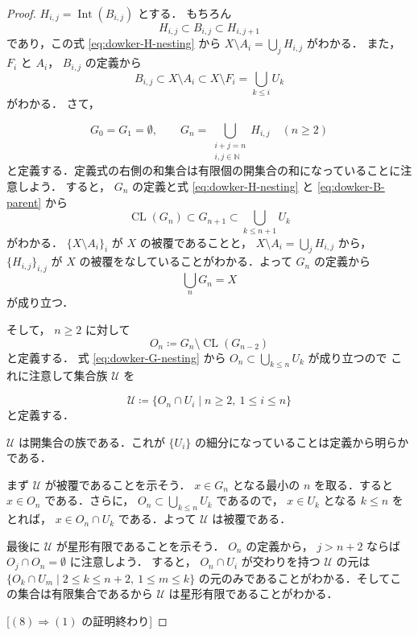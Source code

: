 \documentclass[leqno, 12pt]{ltjsarticle}
\newcommand{\To}{\Longrightarrow}
\newcommand{\nn}{\mathbb{N}}
\DeclareMathOperator{\cl}{CL}
\DeclareMathOperator{\nai}{Int}
\begin{document}
\begin{proof}
$H_{i,j}=\nai(B_{i,j})$
とする．
もちろん
\begin{equation*}
H_{i, j}\subset B_{i, j}\subset H_{i,j+1}
\tag{a}\label{eq:dowker-H-nesting}
\end{equation*}
であり，この式
\eqref{eq:dowker-H-nesting}
から
$X\setminus A_{i}=\bigcup_{j}H_{i, j}$
がわかる．
また，
$F_{i}$
と
$A_{i}$，
$B_{i,j}$
の定義から
\begin{equation*}
B_{i,j}\subset X\setminus A_{i}\subset X\setminus F_{i}=\bigcup_{k\le i}U_{k}
\tag{b}\label{eq:dowker-B-parent}
\end{equation*}
がわかる．
さて，

\[
G_{0}=G_{1}=\emptyset,\qquad
G_{n}=\bigcup_{\substack{i+j=n\\i,j\in\nn}}H_{i,j}\quad(n\ge 2)
\]
と定義する．定義式の右側の和集合は有限個の開集合の和になっていることに注意しよう．
すると，
$G_{n}$
の定義と式
\eqref{eq:dowker-H-nesting}
と
\eqref{eq:dowker-B-parent}
から
\begin{equation*}
\cl(G_{n})\subset G_{n+1}\subset \bigcup_{k\le n+1}U_{k}
\tag{c}\label{eq:dowker-G-nesting}
\end{equation*}
がわかる．
$\{X\setminus A_{i}\}_{i}$
が
$X$
の被覆であることと，
$X\setminus A_{i}=\bigcup_{j}H_{i,j}$
から，
$\{H_{i,j}\}_{i,j}$
が
$X$
の被覆をなしていることがわかる．よって
$G_{n}$
の定義から
\[
\bigcup_{n}G_{n}=X
\]
が成り立つ．

そして，
$n\ge 2$
に対して
\[
O_{n}\coloneqq G_{n}\setminus \cl(G_{n-2})
\]
と定義する．
式
\eqref{eq:dowker-G-nesting}
から
$O_{n}\subset \bigcup_{k\le n}U_{k}$
が成り立つので
これに注意して集合族
$\mathcal{U}$
を

\[
\mathcal{U}\coloneqq\{O_{n}\cap U_{i} \mid n\ge 2,\ 1\le i\le n\}
\]
と定義する．

$\mathcal{U}$
は開集合の族である．これが
$\{U_{i}\}$
の細分になっていることは定義から明らかである．


まず
$\mathcal{U}$
が被覆であることを示そう．
$x\in G_{n}$
となる最小の
$n$
を取る．すると
$x\in O_{n}$
である．さらに，
$O_{n}\subset \bigcup_{k\le n}U_{k}$
であるので，
$x\in U_{k}$
となる
$k\le n$
をとれば，
$x\in O_{n}\cap U_{k}$
である．よって
$\mathcal{U}$
は被覆である．

最後に
$\mathcal{U}$
が星形有限であることを示そう．
$O_{n}$
の定義から，
$j>n+2$
ならば
$O_{j}\cap O_{n}=\emptyset$
に注意しよう．
すると，
$O_{n}\cap U_{i}$
が交わりを持つ
$\mathcal{U}$
の元は
$\{O_{k}\cap U_{m} \mid 2\le k\le n+2,\ 1\le m\le k\}$
の元のみであることがわかる．そしてこの集合は有限集合であるから
$\mathcal{U}$
は星形有限であることがわかる．



[$(8)\To (1)$
の証明終わり]
\end{proof}
\end{document}
